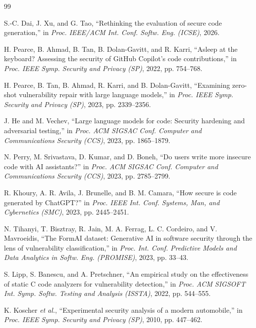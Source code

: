 \documentclass[12pt]{IEEEtran}
\begin{document}
\begin{thebibliography}{99}

S.-C. Dai, J. Xu, and G. Tao, ``Rethinking the evaluation of secure code generation,'' in \emph{Proc. IEEE/ACM Int. Conf. Softw. Eng. (ICSE)}, 2026.

H. Pearce, B. Ahmad, B. Tan, B. Dolan-Gavitt, and R. Karri, ``Asleep at the keyboard? Assessing the security of GitHub Copilot's code contributions,'' in \emph{Proc. IEEE Symp. Security and Privacy (SP)}, 2022, pp. 754--768.

H. Pearce, B. Tan, B. Ahmad, R. Karri, and B. Dolan-Gavitt, ``Examining zero-shot vulnerability repair with large language models,'' in \emph{Proc. IEEE Symp. Security and Privacy (SP)}, 2023, pp. 2339--2356.

J. He and M. Vechev, ``Large language models for code: Security hardening and adversarial testing,'' in \emph{Proc. ACM SIGSAC Conf. Computer and Communications Security (CCS)}, 2023, pp. 1865--1879.

N. Perry, M. Srivastava, D. Kumar, and D. Boneh, ``Do users write more insecure code with AI assistants?'' in \emph{Proc. ACM SIGSAC Conf. Computer and Communications Security (CCS)}, 2023, pp. 2785--2799.

R. Khoury, A. R. Avila, J. Brunelle, and B. M. Camara, ``How secure is code generated by ChatGPT?'' in \emph{Proc. IEEE Int. Conf. Systems, Man, and Cybernetics (SMC)}, 2023, pp. 2445--2451.

N. Tihanyi, T. Bisztray, R. Jain, M. A. Ferrag, L. C. Cordeiro, and V. Mavroeidis, ``The FormAI dataset: Generative AI in software security through the lens of vulnerability classification,'' in \emph{Proc. Int. Conf. Predictive Models and Data Analytics in Softw. Eng. (PROMISE)}, 2023, pp. 33--43.

S. Lipp, S. Banescu, and A. Pretschner, ``An empirical study on the effectiveness of static C code analyzers for vulnerability detection,'' in \emph{Proc. ACM SIGSOFT Int. Symp. Softw. Testing and Analysis (ISSTA)}, 2022, pp. 544--555.

K. Koscher \emph{et al.}, ``Experimental security analysis of a modern automobile,'' in \emph{Proc. IEEE Symp. Security and Privacy (SP)}, 2010, pp. 447--462.


\end{thebibliography}
\end{document}
